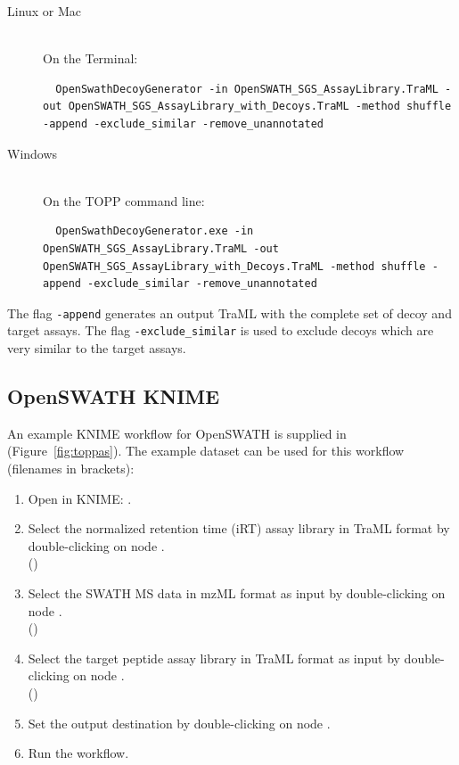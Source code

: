 \begin{description}
  \item[Linux or Mac] \hfill \\
    On the Terminal:
    \begin{lstlisting}
  OpenSwathDecoyGenerator -in OpenSWATH_SGS_AssayLibrary.TraML -out OpenSWATH_SGS_AssayLibrary_with_Decoys.TraML -method shuffle -append -exclude_similar -remove_unannotated
  \end{lstlisting}
  \item[Windows] \hfill \\
    On the TOPP command line:
    \begin{lstlisting}
  OpenSwathDecoyGenerator.exe -in OpenSWATH_SGS_AssayLibrary.TraML -out OpenSWATH_SGS_AssayLibrary_with_Decoys.TraML -method shuffle -append -exclude_similar -remove_unannotated
  \end{lstlisting}
\end{description}

The flag \texttt{-append} generates an output TraML with the complete set of decoy and target assays. The flag \texttt{-exclude\_similar} is used to exclude decoys which are very similar to the target assays.  

\subsection{OpenSWATH KNIME}
An example KNIME workflow for OpenSWATH is supplied in  (Figure~\ref{fig:toppas}). The example dataset can be used for this workflow (filenames in brackets):

\begin{enumerate}
  \item Open  in KNIME: .
  \item Select the normalized retention time (iRT) assay library in TraML format by double-clicking on node .\\
  ()
  \item Select the SWATH MS data in mzML format as input by double-clicking on node .\\
  ()
  \item Select the target peptide assay library in TraML format  as input by double-clicking on node .\\
  ()
  \item Set the output destination by double-clicking on node .\\
  \item Run the workflow.
\end{enumerate}

